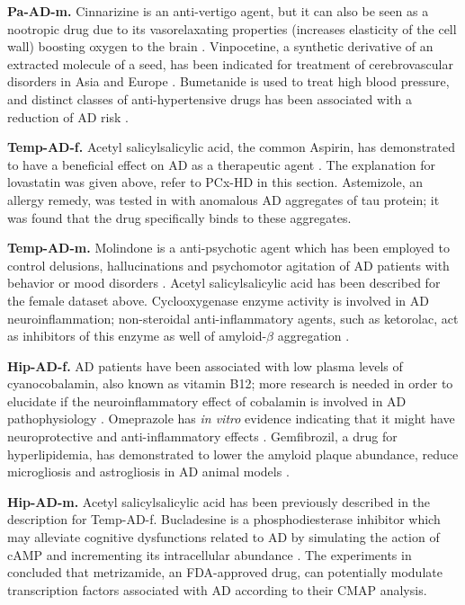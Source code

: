 \textbf{Pa-AD-m.} Cinnarizine is an anti-vertigo agent, but it can also be seen as a nootropic drug due to its vasorelaxating properties (increases elasticity of the cell wall) boosting oxygen to the brain \cite{deka}. Vinpocetine, a synthetic derivative of an extracted molecule of a seed, has been indicated for treatment of cerebrovascular disorders in Asia and Europe \cite{zhang2018}. Bumetanide is used to treat high blood pressure, and distinct classes of anti-hypertensive drugs has been associated with a reduction of AD risk \cite{chuang}.

\textbf{Temp-AD-f.} Acetyl salicylsalicylic acid, the common Aspirin, has demonstrated to have a beneficial effect on AD as a therapeutic agent \cite{choi}. The explanation for lovastatin was given above, refer to PCx-HD in this section. Astemizole, an allergy remedy, was tested in \cite{rojo} with anomalous AD aggregates of tau protein; it was found that the drug specifically binds to these aggregates.

\textbf{Temp-AD-m.} Molindone is a anti-psychotic agent which has been employed to control delusions, hallucinations and psychomotor agitation of AD patients with behavior or mood disorders \cite{cummings}. Acetyl salicylsalicylic acid has been described for the female dataset above. Cyclooxygenase enzyme activity is involved in AD neuroinflammation; non-steroidal anti-inflammatory agents, such as ketorolac, act as inhibitors of this enzyme as well of amyloid-$\beta$ aggregation \cite{ali}. 

\textbf{Hip-AD-f.} AD patients have been associated with low plasma levels of cyanocobalamin, also known as vitamin B12; more research is needed in order to elucidate if the neuroinflammatory effect of cobalamin is involved in AD pathophysiology \cite{politis}. Omeprazole has \textit{in vitro} evidence indicating that it might have neuroprotective and anti-inflammatory effects \cite{ortiz}. Gemfibrozil, a drug for hyperlipidemia, has demonstrated to lower the amyloid plaque abundance, reduce microgliosis and astrogliosis in AD animal models \cite{chandra}.

\textbf{Hip-AD-m.} Acetyl salicylsalicylic acid has been previously described in the description for Temp-AD-f. Bucladesine is a phosphodiesterase inhibitor which may alleviate cognitive dysfunctions related to AD by simulating the action of cAMP and incrementing its intracellular abundance \cite{aghsami}. The experiments in \cite{vargas} concluded that metrizamide, an FDA-approved drug, can potentially modulate transcription factors associated with AD according to their CMAP analysis.

